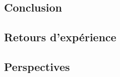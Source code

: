
\subsection{Conclusion}\label{ssec:conclusion_conclusion}


\subsection{Retours d'expérience}\label{ssec:conclusion_retours}



\subsection{Perspectives}\label{ssec:conclusion_perspectives}


